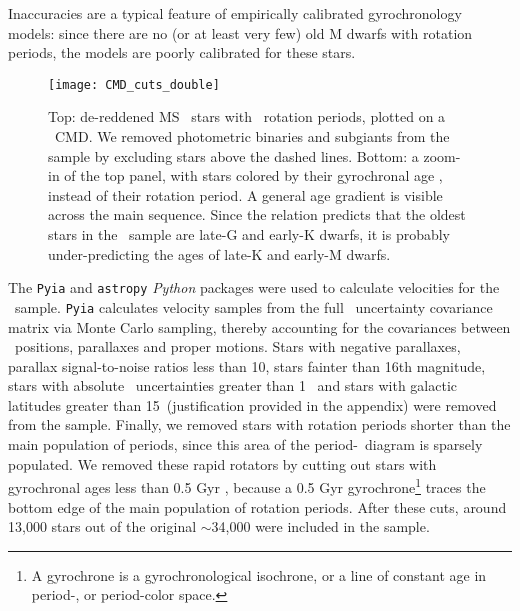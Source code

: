 Inaccuracies are a typical feature of empirically calibrated gyrochronology
models: since there are no (or at least very few) old M dwarfs with rotation
periods, the models are poorly calibrated for these stars.
\begin{figure}
  \caption{
      Top: de-reddened MS \kepler\ stars with \mct\ rotation periods, plotted
    on a \gaia\ CMD.
    We removed photometric binaries and subgiants from the sample by excluding
    stars above the dashed lines.
    Bottom: a zoom-in of the top panel, with stars colored by their
    gyrochronal age \citep{angus2019}, instead of their rotation period.
    A general age gradient is visible across the main sequence.
    Since the \citet{angus2019} relation predicts that the oldest stars in
    the \mct\ sample are late-G and early-K dwarfs, it is probably
    under-predicting the ages of late-K and early-M dwarfs.
}
  \centering
    \texttt{[image: CMD\_cuts\_double]}
\label{fig:age_gradient}
\end{figure}

The {\tt Pyia} \citep{price-whelan_2018} and {\tt astropy} \citep{astropy2013,
astropy2018} {\it Python} packages were used to calculate velocities for the
\mct\ sample.
{\tt Pyia} calculates velocity samples from the full \gaia\ uncertainty
covariance matrix via Monte Carlo sampling, thereby accounting for the
covariances between \gaia\ positions, parallaxes and proper motions.
Stars with negative parallaxes, parallax signal-to-noise ratios less than 10,
stars fainter than 16th magnitude, stars with absolute \vb\ uncertainties
greater than 1 \kms\, and stars with galactic latitudes greater than
15\degrees\ (justification provided in the appendix) were removed from the
sample.
Finally, we removed stars with rotation periods shorter than the main
population of periods, since this area of the period-\teff\ diagram is
sparsely populated.
We removed these rapid rotators by cutting out stars with gyrochronal ages
less than 0.5 Gyr \citep[based on the][gyro-model]{angus2019}, because a 0.5
Gyr gyrochrone\footnote{A gyrochrone is a gyrochronological isochrone, or a
line of constant age in period-\teff, or period-color space.} traces the
bottom edge of the main population of rotation periods.
After these cuts, around 13,000 stars out of the original $\sim$34,000 were
included in the sample.


